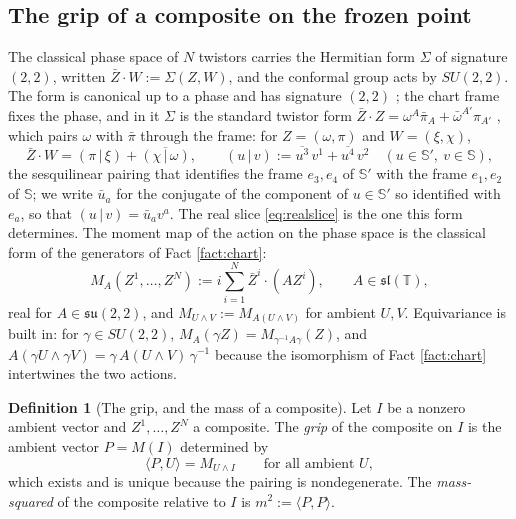 \documentclass[11pt]{article}
\theoremstyle{definition}
\newtheorem{definition}[theorem]{Definition}
\newcommand{\T}{\mathbb{T}}
\newcommand{\ip}[2]{\langle #1, #2\rangle}
\newcommand{\hp}[2]{( #1 \,|\, #2 )}
\newcommand{\Sc}{\mathbb{S}}
\begin{document}
\subsection{The grip of a composite on the frozen point}

The classical phase space of $N$ twistors carries the Hermitian form $\Sigma$ of signature $(2,2)$, written $\bar{Z}\cdot W := \Sigma(Z, W)$, and the conformal group acts by $SU(2,2)$. The form is canonical up to a phase and has signature $(2,2)$ \cite[Prop.~4.5(1), (2), (4)]{ButlerT9}; the chart frame fixes the phase, and in it $\Sigma$ is the standard twistor form $\bar{Z}\cdot Z = \omega^{A}\bar\pi_{A} + \bar\omega^{A'}\pi_{A'}$ \cite{PenroseRindler1986}, which pairs $\omega$ with $\bar\pi$ through the frame: for $Z = (\omega, \pi)$ and $W = (\xi, \chi)$,
\begin{equation}\label{eq:hermitian}
\bar{Z}\cdot W = \hp{\pi}{\xi} + \overline{\hp{\chi}{\omega}}, \qquad \hp{u}{v} := \overline{u^{3}}\,v^{1} + \overline{u^{4}}\,v^{2}\quad (u \in \Sc',\ v \in \Sc),
\end{equation}
the sesquilinear pairing that identifies the frame $e_{3}, e_{4}$ of $\Sc'$ with the frame $e_{1}, e_{2}$ of $\Sc$; we write $\bar{u}_{a}$ for the conjugate of the component of $u \in \Sc'$ so identified with $e_{a}$, so that $\hp{u}{v} = \bar{u}_{a}v^{a}$. The real slice \eqref{eq:realslice} is the one this form determines. The moment map of the action on the phase space is the classical form of the generators of Fact \ref{fact:chart}:
\begin{equation}\label{eq:moment}
M_{A}(Z^{1}, \dots, Z^{N}) := i\sum_{i=1}^{N} \bar{Z}^{i}\cdot(A Z^{i}), \qquad A \in \mathfrak{sl}(\T),
\end{equation}
real for $A \in \mathfrak{su}(2,2)$, and $M_{U\wedge V} := M_{A(U\wedge V)}$ for ambient $U, V$. Equivariance is built in: for $\gamma \in SU(2,2)$, $M_{A}(\gamma Z) = M_{\gamma^{-1}A\gamma}(Z)$, and $A(\gamma U \wedge \gamma V) = \gamma\,A(U\wedge V)\,\gamma^{-1}$ because the isomorphism of Fact \ref{fact:chart} intertwines the two actions.

\begin{definition}[The grip, and the mass of a composite]\label{def:grip}
Let $I$ be a nonzero ambient vector and $Z^{1}, \dots, Z^{N}$ a composite. The \emph{grip} of the composite on $I$ is the ambient vector $P = M(I)$ determined by
\[
\ip{P}{U} = M_{U\wedge I} \qquad\text{for all ambient } U,
\]
which exists and is unique because the pairing is nondegenerate. The \emph{mass-squared} of the composite relative to $I$ is $m^{2} := \ip{P}{P}$.
\end{definition}
\end{document}
